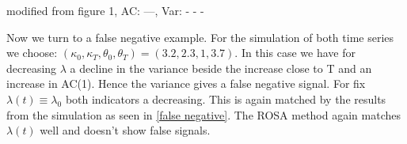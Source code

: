 \documentclass[%
thesis=student,%
coverpage=false,%
titlepage=false,%
headmarks=true, %
german,%
font=libertine, %
math=newpxtx, %
BCOR=5mm,%
coverBCOR=11mm%
]{tumbook}
\begin{document}
    \begin{minipage}{\textwidth}
    \centering
    \label{false positive}
    modified from \cite{Morr:2024} figure 1, AC: ---, Var: - - -
\end{minipage}

Now we turn to a false negative example. For the simulation of both time series we choose: $(\kappa_{0},\kappa_{T},\theta_{0},\theta_{T}) = (3.2,2.3,1,3.7)$. In this case we have for decreasing $\lambda$ a decline in the variance beside the increase close to T and an increase in AC(1). Hence the variance gives a false negative signal. For fix $\lambda(t) \equiv \lambda_{0}$ both indicators a decreasing. This is again matched by the results from the simulation as seen in \ref{false negative}. The ROSA method again matches $\lambda(t)$ well and doesn't show false signals.
\end{document}
